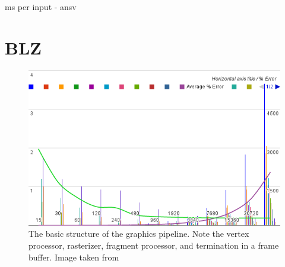 ms per input - ansv

\section{BLZ}

\begin{figure}[ht!]
\centering
\includegraphics[width=1.0\textwidth]{images/chart.png}
\caption{The basic structure of the graphics pipeline. Note the vertex processor, rasterizer, fragment processor, and termination in a frame buffer. Image taken from  \protect\cite{pipeline-image-ref}}
\label{fig:graphics-pipeline}
\end{figure}

